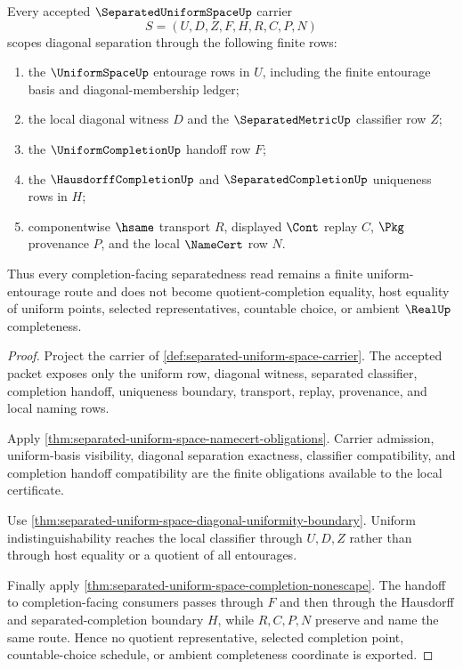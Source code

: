 \begin{theorem}
\label{thm:separated-uniform-space-obligation-scope}
Every accepted $\SeparatedUniformSpaceUp$ carrier
$$
S=(U,D,Z,F,H,R,C,P,N)
$$
scopes diagonal separation through the following finite rows:
\begin{enumerate}
\item the $\UniformSpaceUp$ entourage rows in $U$, including the finite entourage basis and diagonal-membership ledger;
\item the local diagonal witness $D$ and the $\SeparatedMetricUp$ classifier row $Z$;
\item the $\UniformCompletionUp$ handoff row $F$;
\item the $\HausdorffCompletionUp$ and $\SeparatedCompletionUp$ uniqueness rows in $H$;
\item componentwise $\hsame$ transport $R$, displayed $\Cont$ replay $C$, $\Pkg$ provenance $P$, and the local $\NameCert$ row $N$.
\end{enumerate}
Thus every completion-facing separatedness read remains a finite uniform-entourage route and does not become quotient-completion equality, host equality of uniform points, selected representatives, countable choice, or ambient $\RealUp$ completeness.
\end{theorem}
\begin{proof}
Project the carrier of \autoref{def:separated-uniform-space-carrier}. The accepted packet exposes only the uniform row, diagonal witness, separated classifier, completion handoff, uniqueness boundary, transport, replay, provenance, and local naming rows.

Apply \autoref{thm:separated-uniform-space-namecert-obligations}. Carrier admission, uniform-basis visibility, diagonal separation exactness, classifier compatibility, and completion handoff compatibility are the finite obligations available to the local certificate.

Use \autoref{thm:separated-uniform-space-diagonal-uniformity-boundary}. Uniform indistinguishability reaches the local classifier through $U,D,Z$ rather than through host equality or a quotient of all entourages.

Finally apply \autoref{thm:separated-uniform-space-completion-nonescape}. The handoff to completion-facing consumers passes through $F$ and then through the Hausdorff and separated-completion boundary $H$, while $R,C,P,N$ preserve and name the same route. Hence no quotient representative, selected completion point, countable-choice schedule, or ambient completeness coordinate is exported.
\end{proof}

